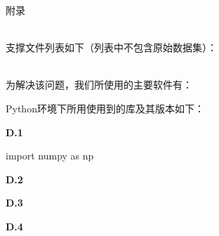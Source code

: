 \documentclass{MathorCupModeling}
\begin{document}
	\newpage


	\begin{center}
		\heiti{} 附\hspace{2pc}录
	\end{center}


\newpage
	~\\

	支撑文件列表如下（列表中不包含原始数据集）：

\newpage
	~\\

	为解决该问题，我们所使用的主要软件有：
	
	Python环境下所用使用到的库及其版本如下：

\newpage

\textbf{D.1 }
\begin{python}
import numpy as np
\end{python}
\newpage
\textbf{D.2 }

\newpage
\textbf{D.3 }

\newpage
\textbf{D.4 }
\end{document}
